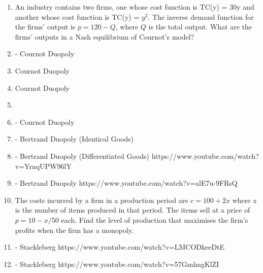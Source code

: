 \documentclass[]{article}
\begin{document}
\begin{enumerate}
\item An industry contains two firms, one whose cost function is TC(y) = 30y and another whose cost function is TC(y) = $y^2$. The inverse demand function for the firms' output is $p = 120 - Q$, where $Q$ is the total output. What are the firms' outputs in a Nash equilibrium of Cournot's model?



\item- Cournot Duopoly

\item Cournot Duopoly

\item Cournot Duopoly


\item 


\item - Cournot Duopoly


\item - Bertrand Duopoly (Identical Goods)

\item - Bertrand Duopoly (Differentiated Goods)
https://www.youtube.com/watch?v=YrnqUPW96lY

\item - Bertrand Duopoly
     https://www.youtube.com/watch?v=alE7u-9FRsQ

\item 
The costs incurred by a firm in a production period are
$c = 100 + 2x$
where x is the number of items produced in that period. The items sell
at a price of
$p = 10 − x/50$
each. Find the level of production that maximises the firm’s profits
when the firm has a monopoly. 
\item - Stackleberg
https://www.youtube.com/watch?v=LMCODkeeDtE

\item - Stackleberg
https://www.youtube.com/watch?v=57GmlmgKlZI
\end{enumerate}
\end{document}
